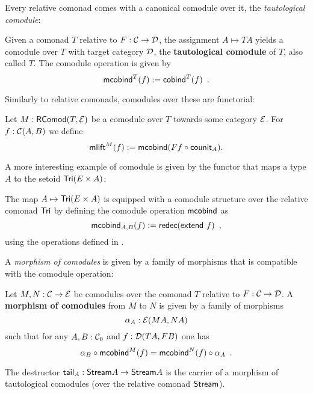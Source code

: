 \documentclass{amsart}
\newcommand{\fat}[1]{\textbf{#1}}
\begin{document}
Every relative comonad comes with a canonical comodule over it, the \emph{tautological comodule}:

\begin{definition}\label{def:tautological_comodule}
  Given a comonad $T$ relative to $F:\C\to\D$, the assignment $A \mapsto TA$ yields a comodule over $T$ 
  with target category $\D$, the \textbf{tautological comodule} of $T$, also called $T$.
  The comodule operation is given by
    \[  \mcobind^T(f) := \cobind^T(f) \enspace . \]
\end{definition}

Similarly to relative comonads, comodules over these are functorial:

\begin{definition}\label{def:comodule_lift}
 Let $M : \RComod(T,\E)$ be a comodule over $T$ towards some category $\E$. For $f : \C(A,B)$ we define
  \[ \mlift^M(f) := \mcobind(\comp{\counit_A}{Ff}) .  \]
\end{definition}


A more interesting example of comodule is given by the functor that maps a type $A$ to the setoid $\Tri(E\times A)$:
\begin{example}\label{ex_tri_prod_comod}
   The map $A \mapsto \Tri(E\times A)$ is equipped with a comodule structure over the relative comonad $\Tri$ by
   defining the comodule operation $\mcobind$ as
     \[ \mcobind_{A,B} (f) := \redec (\extend~f) \enspace , \]
  using the operations defined in .
\end{example}



A \emph{morphism of comodules} is given by a family of morphisms that is compatible with 
the comodule operation:

\begin{definition}\label{def:morphism_of_comodules}
 Let $M, N : \C \to \E$ be comodules over the comonad $T$ relative to  $F:\C \to \D$.
 A \fat{morphism of comodules} from $M$ to $N$ is given by a family of morphisms 
   \[ \alpha_A:\E(MA,NA) \]
 such that for any $A,B:\C_0$ and $f : \D(TA,FB)$ one has
 \[   \comp{\mcobind^M(f)}{\alpha_B} = \comp{\alpha_A}{\mcobind^N(f)} \enspace . \]
\end{definition}

 \begin{example}\label{ex_tail_comodule}
  The destructor $\stail_A : \stream A \to \stream A$ is the carrier of a morphism of tautological comodules (over the relative comonad $\stream$).
 \end{example}
\end{document}
